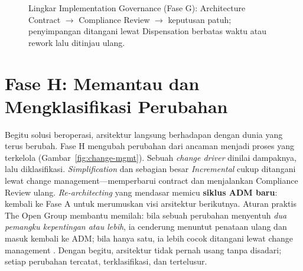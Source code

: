 \begin{figure}[htbp]
\centering
{}
\caption{Lingkar Implementation Governance (Fase G): Architecture Contract
$\rightarrow$ Compliance Review $\rightarrow$ keputusan patuh; penyimpangan
ditangani lewat Dispensation berbatas waktu atau rework lalu ditinjau ulang.}
\label{fig:governance-loop}
\end{figure}

\section{Fase H: Memantau dan Mengklasifikasi Perubahan}

Begitu solusi beroperasi, arsitektur langsung berhadapan dengan dunia yang terus
berubah. Fase H mengubah perubahan dari ancaman menjadi proses yang terkelola
(Gambar~\ref{fig:change-mgmt}). Sebuah \emph{change driver} dinilai dampaknya, lalu
diklasifikasi. \emph{Simplification} dan sebagian besar \emph{Incremental} cukup
ditangani lewat change management---memperbarui contract dan menjalankan Compliance
Review ulang. \emph{Re-architecting} yang mendasar memicu \textbf{siklus ADM baru}:
kembali ke Fase A untuk merumuskan visi arsitektur berikutnya. Aturan praktis The
Open Group membantu memilah: bila sebuah perubahan menyentuh \emph{dua pemangku
kepentingan atau lebih}, ia cenderung menuntut penataan ulang dan masuk kembali ke
ADM; bila hanya satu, ia lebih cocok ditangani lewat change management
\cite{togaf10}. Dengan begitu, arsitektur tidak pernah usang tanpa disadari; setiap
perubahan tercatat, terklasifikasi, dan tertelusur.

